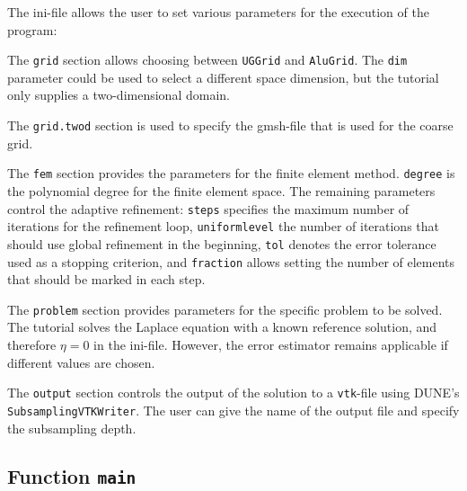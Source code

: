 \documentclass[a4paper,12pt]{article}
\begin{document}
The ini-file allows the user to set various parameters for the
execution of the program:


The \lstinline{grid} section allows choosing between \lstinline{UGGrid} and \lstinline{AluGrid}.
The \lstinline{dim} parameter could be used to select a different space dimension, but the
tutorial only supplies a two-dimensional domain.


The \lstinline{grid.twod} section is used to specify the gmsh-file that is used for the
coarse grid.


The \lstinline{fem} section provides the parameters for the finite element method.
\lstinline{degree} is the polynomial degree for the finite element space. The remaining
parameters control the adaptive refinement: \lstinline{steps} specifies the maximum number of
iterations for the refinement loop, \lstinline{uniformlevel} the number of iterations that
should use global refinement in the beginning, \lstinline{tol} denotes the error tolerance
used as a stopping criterion, and \lstinline{fraction} allows setting the number of elements that
should be marked in each step.


The \lstinline{problem} section provides parameters for the specific problem to be solved. The
tutorial solves the Laplace equation with a known reference solution, and therefore $\eta = 0$ in
the ini-file. However, the error estimator remains applicable if different values are chosen.


The \lstinline{output} section controls the output of the solution
to a \lstinline{vtk}-file using DUNE's \lstinline{SubsamplingVTKWriter}.
The user can give the name of the output file and specify the subsampling depth.

\subsection{Function \lstinline{main}}
\end{document}
